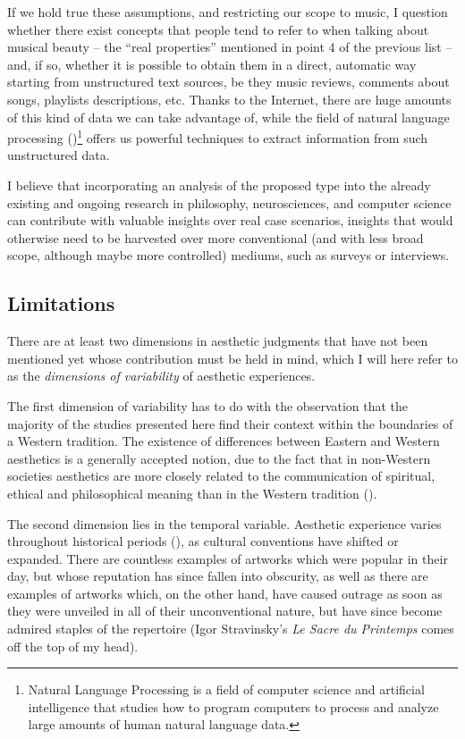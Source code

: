 If we hold true these assumptions, and restricting our scope to music, I question whether there exist concepts that people tend to refer to when talking about musical beauty -- the ``real properties'' mentioned in point 4 of the previous list -- and, if so, whether it is possible to obtain them in a direct, automatic way starting from unstructured text sources, be they music reviews, comments about songs, playlists descriptions, etc. Thanks to the Internet, there are huge amounts of this kind of data we can take advantage of, while the field of natural language processing ()\footnote{Natural Language Processing is a field of computer science and artificial intelligence that studies how to program computers to process and analyze large amounts of human natural language data.} offers us powerful techniques to extract information from such unstructured data.

I believe that incorporating an analysis of the proposed type into the already existing and ongoing research in philosophy, neurosci\-ences, and computer science can contribute with valuable insights over real case scenarios, insights that would otherwise need to be harvested over more conventional (and with less broad scope, although maybe more controlled) mediums, such as surveys or interviews.

\subsection{Limitations}\label{subsec:limits}
There are at least two dimensions in aesthetic judgments that have not been mentioned yet whose contribution must be held in mind, which I will here refer to as the \emph{dimensions of variability} of aesthetic experiences.

The first dimension of variability has to do with the observation that the majority of the studies presented here find their context within the boundaries of a Western tradition. The existence of differences between Eastern and Western aesthetics is a generally accepted notion, due to the fact that in non-Western societies aesthetics are more closely related to the communication of spiritual, ethical and philosophical meaning than in the Western tradition (\cite{anderson1989comparative}).

The second dimension lies in the temporal variable. Aesthetic experience varies throughout historical periods (\cite{pearce2016neuroaesthetics}), as cultural conventions have shifted or expanded. There are countless examples of artworks which
were popular in their day, but whose reputation has since fallen into obscurity, as well as there are examples of artworks which, on the other hand, have caused outrage  as soon as they were unveiled in all of their unconventional nature, but have since become admired staples of the repertoire (Igor Stravinsky's \emph{Le Sacre du Printemps} comes off the top of my head).


